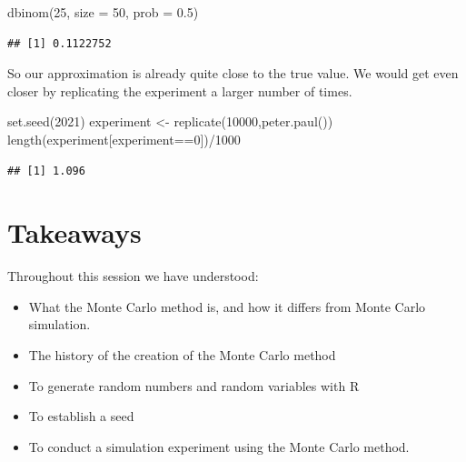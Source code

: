 \documentclass[
]{book}
\newenvironment{Shaded}{\begin{snugshade}}{\end{snugshade}}
\newcommand{\AttributeTok}[1]{\textcolor[rgb]{0.77,0.63,0.00}{#1}}
\newcommand{\DecValTok}[1]{\textcolor[rgb]{0.00,0.00,0.81}{#1}}
\newcommand{\FloatTok}[1]{\textcolor[rgb]{0.00,0.00,0.81}{#1}}
\newcommand{\FunctionTok}[1]{\textcolor[rgb]{0.00,0.00,0.00}{#1}}
\newcommand{\NormalTok}[1]{#1}
\newcommand{\OtherTok}[1]{\textcolor[rgb]{0.56,0.35,0.01}{#1}}
\newcommand{\SpecialCharTok}[1]{\textcolor[rgb]{0.00,0.00,0.00}{#1}}
\providecommand{\tightlist}{%
  \setlength{\itemsep}{0pt}\setlength{\parskip}{0pt}}
\begin{document}
\begin{Shaded}
\begin{Highlighting}[]
\FunctionTok{dbinom}\NormalTok{(}\DecValTok{25}\NormalTok{, }\AttributeTok{size =} \DecValTok{50}\NormalTok{, }\AttributeTok{prob =} \FloatTok{0.5}\NormalTok{)}
\end{Highlighting}
\end{Shaded}

\begin{verbatim}
## [1] 0.1122752
\end{verbatim}

So our approximation is already quite close to the true value. We would get even closer by replicating the experiment a larger number of times.

\begin{Shaded}
\begin{Highlighting}[]
\FunctionTok{set.seed}\NormalTok{(}\DecValTok{2021}\NormalTok{)}
\NormalTok{experiment }\OtherTok{\textless{}{-}} \FunctionTok{replicate}\NormalTok{(}\DecValTok{10000}\NormalTok{,}\FunctionTok{peter.paul}\NormalTok{())}
\FunctionTok{length}\NormalTok{(experiment[experiment}\SpecialCharTok{==}\DecValTok{0}\NormalTok{])}\SpecialCharTok{/}\DecValTok{1000}
\end{Highlighting}
\end{Shaded}

\begin{verbatim}
## [1] 1.096
\end{verbatim}

\hypertarget{takeaways}{%
\section{Takeaways}\label{takeaways}}

Throughout this session we have understood:

\begin{itemize}
\tightlist
\item
  What the Monte Carlo method is, and how it differs from Monte Carlo simulation.
\item
  The history of the creation of the Monte Carlo method
\item
  To generate random numbers and random variables with R
\item
  To establish a seed
\item
  To conduct a simulation experiment using the Monte Carlo method.
\end{itemize}
\end{document}
